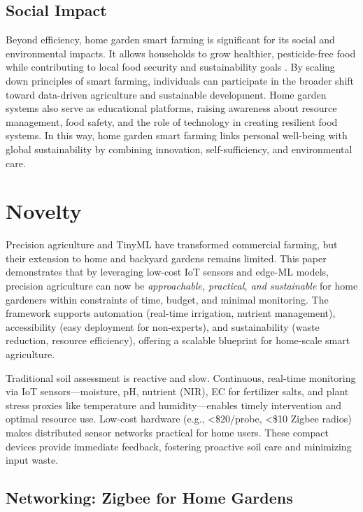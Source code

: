 \documentclass{sigchi}
\begin{document}
\subsection{Social Impact}

Beyond efficiency, home garden smart farming is significant for its social and environmental impacts. It allows households to grow healthier, pesticide-free food while contributing to local food security and sustainability goals \cite{elbilali2018smart}. By scaling down principles of smart farming, individuals can participate in the broader shift toward data-driven agriculture and sustainable development. Home garden systems also serve as educational platforms, raising awareness about resource management, food safety, and the role of technology in creating resilient food systems\cite{wolfert2017big}. In this way, home garden smart farming links personal well-being with global sustainability by combining innovation, self-sufficiency, and environmental care.

\section{Novelty}

Precision agriculture and TinyML have transformed commercial farming, but their extension to home and backyard gardens remains limited. This paper demonstrates that by leveraging low-cost IoT sensors and edge-ML models, precision agriculture can now be \emph{approachable, practical, and sustainable} for home gardeners within constraints of time, budget, and minimal monitoring. The framework supports automation (real-time irrigation, nutrient management), accessibility (easy deployment for non-experts), and sustainability (waste reduction, resource efficiency), offering a scalable blueprint for home-scale smart agriculture.

Traditional soil assessment is reactive and slow. Continuous, real-time monitoring via IoT sensors—moisture, pH, nutrient (NIR), EC for fertilizer salts, and plant stress proxies like temperature and humidity—enables timely intervention and optimal resource use. Low-cost hardware (e.g., <\$20/probe, <\$10 Zigbee radios) makes distributed sensor networks practical for home users. These compact devices provide immediate feedback, fostering proactive soil care and minimizing input waste.

\subsection{Networking: Zigbee for Home Gardens}
\end{document}
